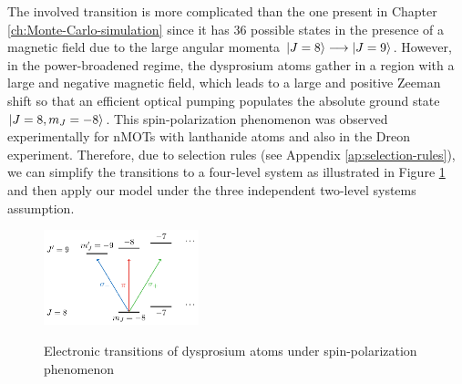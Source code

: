The involved transition is more complicated than the one present in Chapter \ref{ch:Monte-Carlo-simulation} since it has 36 possible states in the presence of a magnetic field due to the large angular momenta $ \ket{J = 8} \longrightarrow \ket{J = 9} $. However, in the power-broadened regime, the dysprosium atoms gather in a region with a large and negative magnetic field, which leads to a large and positive Zeeman shift so that an efficient optical pumping populates the absolute ground state $ \ket{J = 8, m_J = -8} $. This spin-polarization phenomenon was observed experimentally for nMOTs with lanthanide atoms \cite{lu2011strongly,aikawa2012bose} and also in the Dreon experiment. Therefore, due to selection rules (see Appendix \ref{ap:selection-rules}), we can simplify the transitions to a four-level system as illustrated in Figure \ref{fig:Dy-Dreon-electronic-transitions} and then apply our model under the three independent two-level systems assumption.

\begin{figure}[!ht]
    \centering
    \caption{Electronic transitions of dysprosium atoms under spin-polarization phenomenon}
    \includegraphics[width=0.4\textwidth]{USPSC-img/Dy-Dreon-transitions.png}
    \vspace{5px}
    \label{fig:Dy-Dreon-electronic-transitions}
\end{figure}

